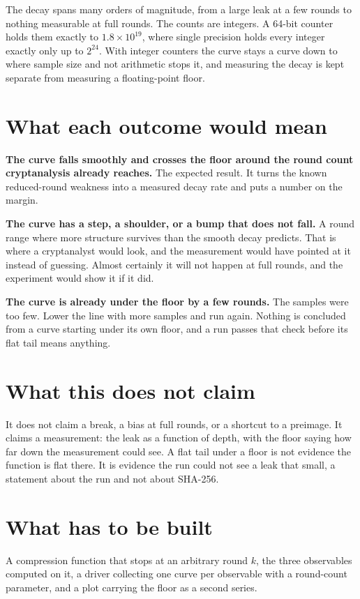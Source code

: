 The decay spans many orders of magnitude, from a large leak at a few rounds to nothing measurable at full rounds. The counts are integers. A 64-bit counter holds them exactly to \(1.8 \times 10^{19}\), where single precision holds every integer exactly only up to \(2^{24}\). With integer counters the curve stays a curve down to where sample size and not arithmetic stops it, and measuring the decay is kept separate from measuring a floating-point floor.

\section{What each outcome would mean}

\textbf{The curve falls smoothly and crosses the floor around the round count cryptanalysis already reaches.} The expected result. It turns the known reduced-round weakness into a measured decay rate and puts a number on the margin.

\textbf{The curve has a step, a shoulder, or a bump that does not fall.} A round range where more structure survives than the smooth decay predicts. That is where a cryptanalyst would look, and the measurement would have pointed at it instead of guessing. Almost certainly it will not happen at full rounds, and the experiment would show it if it did.

\textbf{The curve is already under the floor by a few rounds.} The samples were too few. Lower the line with more samples and run again. Nothing is concluded from a curve starting under its own floor, and a run passes that check before its flat tail means anything.

\section{What this does not claim}

It does not claim a break, a bias at full rounds, or a shortcut to a preimage. It claims a measurement: the leak as a function of depth, with the floor saying how far down the measurement could see. A flat tail under a floor is not evidence the function is flat there. It is evidence the run could not see a leak that small, a statement about the run and not about SHA-256.

\section{What has to be built}

A compression function that stops at an arbitrary round \(k\), the three observables computed on it, a driver collecting one curve per observable with a round-count parameter, and a plot carrying the floor as a second series.
